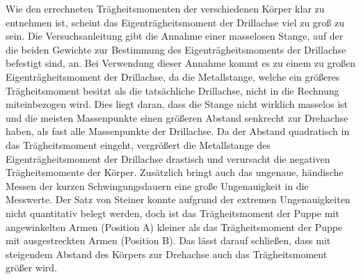 \documentclass[titlepage = firstcover]{scrartcl}
\begin{document}
    Wie den errechneten Trägheitsmomenten der verschiedenen Körper klar zu entnehmen ist, scheint das Eigenträgheitsmoment der Drillachse viel zu groß zu sein.
    Die Versuchsanleitung gibt die Annahme einer masselosen Stange, auf der die beiden Gewichte zur Bestimmung des Eigenträgheitsmoments der Drillachse befestigt sind, an.
    Bei Verwendung dieser Annahme kommt es zu einem zu großen Eigenträgheitsmoment der Drillachse, da die Metallstange, welche ein größeres Trägheitsmoment besitzt als die tatsächliche Drillachse, nicht in die Rechnung miteinbezogen wird.
    Dies liegt daran, dass die Stange nicht wirklich masselos ist und die meisten Massenpunkte einen größeren Abstand senkrecht zur Drehachse haben, als fast alle Massenpunkte der Drillachse.
    Da der Abstand quadratisch in das Trägheitsmoment eingeht, vergrößert die Metallstange des Eigenträgheitsmoment der Drillachse drastisch und verursacht die negativen Trägheitsmomente der Körper.
    Zusätzlich bringt auch das ungenaue, händische Messen der kurzen Schwingungsdauern eine große Ungenauigkeit in die Messwerte.
    Der Satz von Steiner konnte aufgrund der extremen Ungenauigkeiten nicht quantitativ belegt werden, doch ist das Trägheitsmoment der Puppe mit angewinkelten Armen (Position A)
    kleiner als das Trägheitsmoment der Puppe mit ausgestreckten Armen (Position B). Das lässt darauf schließen, dass mit steigendem Abstand des Körpers zur Drehachse auch das Trägheitsmoment größer wird.
\end{document}
